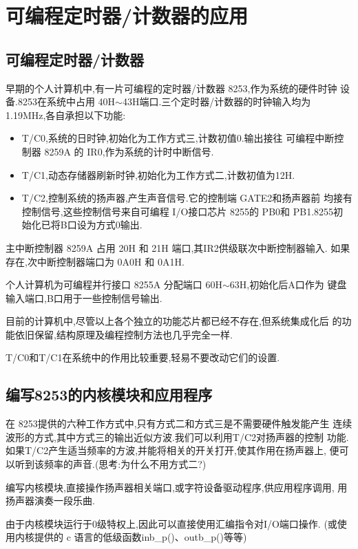 \section{可编程定时器/计数器的应用}
\subsection{可编程定时器/计数器}
    早期的个人计算机中,有一片可编程的定时器/计数器 8253,作为系统的硬件时钟
设备.8253在系统中占用 40H$\sim$43H端口.三个定时器/计数器的时钟输入均为
1.19MHz,各自承担以下功能:
\begin{itemize}\itemsep=-3pt
  \item T/C0,系统的日时钟,初始化为工作方式三,计数初值0.输出接往
        可编程中断控制器 8259A 的 IR0,作为系统的计时中断信号.
  \item T/C1,动态存储器刷新时钟,初始化为工作方式二,计数初值为12H.
  \item T/C2,控制系统的扬声器,产生声音信号.它的控制端 GATE2和扬声器前
        均接有控制信号,这些控制信号来自可编程 I/O接口芯片 8255的
        PB0和 PB1.8255初始化已将B口设为方式0输出.
\end{itemize}

    主中断控制器 8259A 占用 20H 和 21H 端口,其IR2供级联次中断控制器输入.
如果存在,次中断控制器端口为 0A0H 和 0A1H.

    个人计算机为可编程并行接口 8255A 分配端口 60H$\sim$63H,初始化后A口作为
键盘输入端口,B口用于一些控制信号输出.

    目前的计算机中,尽管以上各个独立的功能芯片都已经不存在,但系统集成化后
的功能依旧保留,结构原理及编程控制方法也几乎完全一样.

    T/C0和T/C1在系统中的作用比较重要,轻易不要改动它们的设置.

\subsection{编写8253的内核模块和应用程序}
    在 8253提供的六种工作方式中,只有方式二和方式三是不需要硬件触发能产生
连续波形的方式,其中方式三的输出近似方波.我们可以利用T/C2对扬声器的控制
功能.如果T/C2产生适当频率的方波,并能将相关的开关打开,使其作用在扬声器上,
便可以听到该频率的声音.(思考:为什么不用方式二?)

    编写内核模块,直接操作扬声器相关端口,或字符设备驱动程序,供应用程序调用,
用扬声器演奏一段乐曲.

    由于内核模块运行于0级特权上,因此可以直接使用汇编指令对I/O端口操作.
(或使用内核提供的 c 语言的低级函数inb\_p()、outb\_p()等等)

